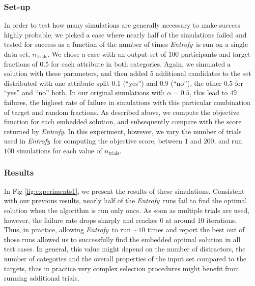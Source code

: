 \documentclass[10pt,letterpaper]{article}
\newcommand{\project}[1]{\textsl{#1}}
\newcommand{\entrofy}{\project{Entrofy}}
\begin{document}
\subsubsection*{Set-up}
In order to test how many simulations are generally necessary to make success highly probable, we picked a case where nearly half of the simulations failed and tested for success as a function of the 
number of times \entrofy\ is run on a single data set, $n_\mathrm{trials}$. We chose a case with an output set of $100$ participants and target fractions of $0.5$ for each attribute in both categories. Again, we simulated a solution with these parameters, and then added $5$ additional candidates to the set distributed with one attribute split $0.1$ (``yes'') and $0.9$ (``no''), the other $0.5$ for ``yes'' and ``no'' both. In our original simulations with $\alpha = 0.5$, this lead to $49$ failures, the highest rate of failure in simulations with this particular combination of target and random fractions. As described above, we compute the objective function for each embedded solution, and subsequently compare with the score returned by \entrofy. In this experiment, however, we vary the number of trials used in \entrofy\ for computing the objective score, between $1$ and $200$, and run $100$ simulations for each value of $n_\mathrm{trials}$. 

\subsubsection*{Results}

In Fig \ref{fig:experiments1}, we present the results of these simulations. Consistent with our previous results, nearly half of the \entrofy\ runs fail to find the optimal solution when the algorithm is run only once. As soon as multiple trials are used, however, the failure rate drops sharply and reaches $0$ at around $10$ iterations. Thus, in practice, allowing \entrofy\ to run $\sim 10$ times and report the best out of those runs allowed us to successfully find the embedded optimal solution in all test cases. In general, this value might depend on the number of distractors, the number of categories and the overall properties of the input set compared to the targets, thus in practice very complex selection procedures might benefit from running additional trials.
\end{document}
